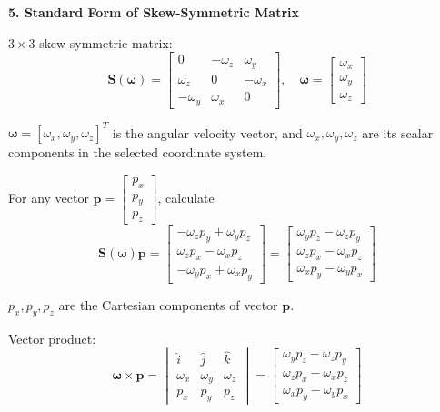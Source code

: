 \documentclass[12pt,a4paper]{report}
\newcommand{\newsymbols}[1]{\par\noindent{}#1\par\vspace{0.35em}}
\newcommand{\vect}[1]{\mathbf{#1}}
\newcommand{\mat}[1]{\mathbf{#1}}
\newcommand{\angvel}{\boldsymbol{\omega}}
\begin{document}
\textbf{5. Standard Form of Skew-Symmetric Matrix}

$3\times 3$ skew-symmetric matrix:
\begin{equation}
\mat{S}(\angvel) = \begin{bmatrix}
0 & -\omega_{z} & \omega_{y} \\
\omega_{z} & 0 & -\omega_{x} \\
-\omega_{y} & \omega_{x} & 0
\end{bmatrix}, \quad
\angvel = \begin{bmatrix} \omega_{x} \\ \omega_{y} \\ \omega_{z} \end{bmatrix}
\end{equation}
\newsymbols{$\angvel = [\omega_x,\omega_y,\omega_z]^T$ is the angular velocity vector, and $\omega_x,\omega_y,\omega_z$ are its scalar components in the selected coordinate system.}

For any vector $\vect{p} = \begin{bmatrix} p_{x} \\ p_{y} \\ p_{z} \end{bmatrix}$, calculate
\begin{equation}
\mat{S}(\angvel)\vect{p} = \begin{bmatrix}
-\omega_{z}p_{y} + \omega_{y}p_{z} \\
\omega_{z}p_{x} - \omega_{x}p_{z} \\
-\omega_{y}p_{x} + \omega_{x}p_{y}
\end{bmatrix}
= \begin{bmatrix}
\omega_{y}p_{z} - \omega_{z}p_{y} \\
\omega_{z}p_{x} - \omega_{x}p_{z} \\
\omega_{x}p_{y} - \omega_{y}p_{x}
\end{bmatrix}
\end{equation}
\newsymbols{$p_x,p_y,p_z$ are the Cartesian components of vector $\vect{p}$.}

Vector product:
\begin{equation}
\angvel \times \vect{p} = \begin{vmatrix}
\hat{i} & \hat{j} & \hat{k} \\
\omega_{x} & \omega_{y} & \omega_{z} \\
p_{x} & p_{y} & p_{z}
\end{vmatrix}
= \begin{bmatrix}
\omega_{y}p_{z} - \omega_{z}p_{y} \\
\omega_{z}p_{x} - \omega_{x}p_{z} \\
\omega_{x}p_{y} - \omega_{y}p_{x}
\end{bmatrix}
\end{equation}
\end{document}
